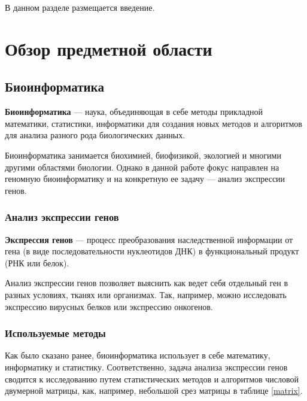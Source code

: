 \documentclass[specification,annotation]{itmo-student-thesis}
\begin{document}


\tableofcontents

\startprefacepage

В данном разделе размещается введение.

\chapter{Обзор предметной области}

\section{Биоинформатика}

\textbf{Биоинформатика} --- наука, объединяющая в себе методы прикладной математики, статистики, информатики для создания новых методов и алгоритмов для анализа разного рода биологических данных.

Биоинформатика занимается биохимией, биофизикой, экологией и многими другими областями биологии. Однако в данной работе фокус направлен на геномную биоинформатику и на конкретную ее задачу --- анализ экспрессии генов.

\subsection{Анализ экспрессии генов}
\textbf{Экспрессия генов} --- процесс преобразования наследственной информации от гена (в виде последовательности нуклеотидов ДНК) в функциональный продукт (РНК или белок).

Анализ экспрессии генов позволяет выяснить как ведет себя отдельный ген в разных условиях, тканях или организмах.
Так, например, можно исследовать экспрессию вирусных белков или экспрессию онкогенов.

\subsection{Используемые методы}
Как было сказано ранее, биоинформатика использует в себе математику, информатику и статистику. Соответственно, задача анализа экспрессии генов сводится к исследованию путем статистических методов и алгоритмов числовой двумерной матрицы, как, например, небольшой срез матрицы в таблице \ref{matrix}.
\end{document}

